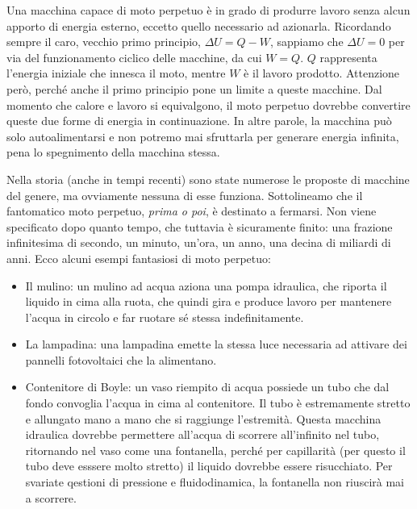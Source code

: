 Una macchina capace di moto
perpetuo è in grado di produrre lavoro senza alcun apporto di energia esterno,
eccetto quello necessario ad azionarla. Ricordando sempre il caro, vecchio primo
principio, $\Delta U = Q - W$, sappiamo che $\Delta U = 0$ per via del
funzionamento ciclico delle macchine, da cui $W = Q$. $Q$ rappresenta l'energia
iniziale che innesca il moto, mentre $W$ è il lavoro prodotto. Attenzione però,
perché anche il primo principio pone un limite a queste macchine.
Dal momento che calore e lavoro si equivalgono, il moto perpetuo dovrebbe
convertire queste due forme di energia in continuazione. In altre parole,
la macchina può solo autoalimentarsi e non potremo mai sfruttarla per generare
energia infinita, pena lo spegnimento della macchina stessa.

Nella storia (anche in tempi recenti) sono state numerose le proposte
di macchine del genere, ma ovviamente nessuna di esse funziona.
Sottolineamo che il fantomatico moto perpetuo, \emph{prima o poi}, è
destinato a fermarsi. Non viene specificato dopo quanto tempo, che tuttavia
è sicuramente finito: una frazione infinitesima di secondo, un minuto,
un'ora, un anno, una decina di miliardi di anni.
Ecco alcuni esempi fantasiosi di moto perpetuo:

\begin{itemize}
    \item Il mulino: un mulino ad acqua aziona una pompa idraulica,
    che riporta il liquido in cima alla ruota, che quindi gira e
    produce lavoro per mantenere l'acqua in circolo e far ruotare
    sé stessa indefinitamente.

    \item La lampadina: una lampadina emette la stessa luce necessaria
    ad attivare dei pannelli fotovoltaici che la alimentano.

    \item Contenitore di Boyle: un vaso riempito di acqua possiede
    un tubo che dal fondo convoglia l'acqua in cima al contenitore.
    Il tubo è estremamente stretto e allungato mano a mano che si
    raggiunge l'estremità. Questa macchina idraulica dovrebbe permettere
    all'acqua di scorrere all'infinito nel tubo, ritornando nel
    vaso come una fontanella, perché per capillarità (per questo il tubo deve esssere molto
    stretto) il liquido dovrebbe essere risucchiato. Per svariate
    qestioni di pressione e fluidodinamica, la fontanella non
    riuscirà mai a scorrere.
\end{itemize}

